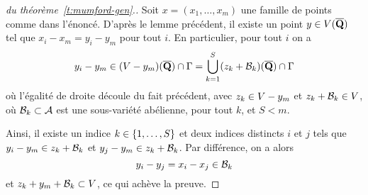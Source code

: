 \begin{proof}[\proofname{} du théorème~\vref{t:mumford-gen}.]
  Soit \( x = (x_1, \dots, x_m) \) une famille de points comme dans l'énoncé.
  D'après le lemme précédent, il existe un point \( y \in V(\overline{{\mathbf{Q}}}) \)
  tel que \( x_i - x_m = y_i - y_m \) pour tout \( i \). En particulier, pour
  tout \( i \) on a
  \begin{equation}
    y_i - y_m
    \in
    (V - y_m)(\overline{{\mathbf{Q}}}) \cap \Gamma
    =
    \bigcup_{k=1}^{S} (z_k + \mathcal B_k)(\overline{{\mathbf{Q}}}) \cap \Gamma
  \end{equation}
  où l'égalité de droite découle du fait précédent, avec \( z_k \in V -
    y_m \) et \( z_k + \mathcal B_k \in V \), où \( \mathcal B_k \subset \mathcal A \) est
  une sous-variété abélienne, pour tout \( k \), et \( S < m \).

  Ainsi, il existe un indice \( k \in \lbrace1, \dots, S\rbrace \) et deux indices
  distincts \( i \) et \( j \) tels que \( y_i - y_m \in z_k + \mathcal B_k \) et \(
    y_j - y_m \in z_k + \mathcal B_k \). Par différence, on a alors
  \begin{equation}
    y_i - y_j = x_i - x_j \in \mathcal B_k
  \end{equation}
  et \( z_k + y_m + \mathcal B_k \subset V \), ce qui achève la preuve.
\end{proof}


\cleardoublepage
\endinput

